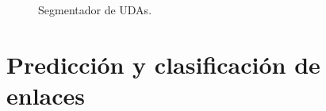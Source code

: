 \documentclass[a4paper,11pt,twocolumn,twoside]{article}
\begin{document}

\begin{figure}[h]
	\centering
	
	\caption{Segmentador de UDAs.}
	\label{fig:segmenter_model}
\end{figure}

\section{Predicción y clasificación de enlaces}

	
\end{document}
